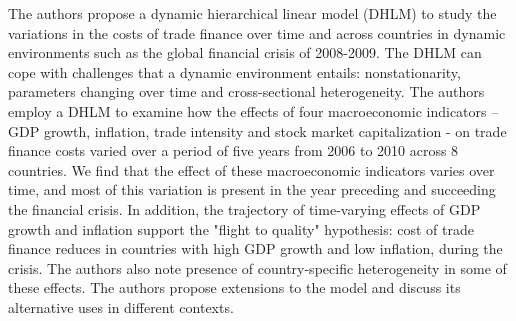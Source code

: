 The authors propose a dynamic hierarchical linear model (DHLM) to study the variations in the costs of trade finance over time and across countries in dynamic environments such as the global financial crisis of 2008-2009. The DHLM can cope with challenges that a dynamic environment entails: nonstationarity, parameters changing over time and cross-sectional heterogeneity. The authors employ a DHLM to examine how the effects of four macroeconomic indicators -- GDP growth, inflation, trade intensity and stock market capitalization - on trade finance costs varied over a period of five years from 2006 to 2010 across 8 countries. We find that the effect of these macroeconomic indicators varies over time, and most of this variation is present in the year preceding and succeeding the financial crisis. In addition, the trajectory of time-varying effects of GDP growth and inflation support the "flight to quality" hypothesis: cost of trade finance reduces in countries with high GDP growth and low inflation, during the crisis. The authors also note presence of country-specific heterogeneity in some of these effects. The authors propose extensions to the model and discuss its alternative uses in different contexts.


